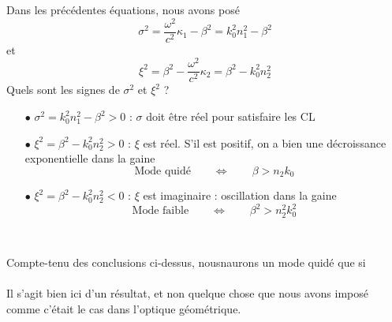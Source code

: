 Dans les précédentes équations, nous avons posé
\begin{equation}
{\sigma ^2} = \frac{{{\omega ^2}}}{{{c^2}}}{\kappa _1} - {\beta ^2} = k_0^2n_1^2 - {\beta ^2}
\end{equation}
et
\begin{equation}
{\xi ^2} = {\beta ^2} - \frac{{{\omega ^2}}}{{{c^2}}}{\kappa _2} = {\beta ^2} - k_0^2n_2^2
\end{equation}
Quels sont les signes de $\sigma^2$ et $\xi^2$ ? 
\begin{itemize}
\item[$\bullet$] ${\sigma ^2} = k_0^2n_1^2 - {\beta ^2} > 0$ : $\sigma$ doit être réel pour 
satisfaire les CL
\item[$\bullet$] ${\xi ^2} = {\beta ^2} - k_0^2n_2^2 > 0$ : $\xi$ est réel. S'il est positif, on a
bien une décroissance exponentielle dans la gaine
\begin{equation}
\text{Mode quidé}\qquad\Leftrightarrow\qquad \beta > n_2k_0
\end{equation}
\item[$\bullet$] ${\xi ^2} = {\beta ^2} - k_0^2n_2^2 < 0$ : $\xi$ est imaginaire : oscillation 
dans la gaine
\begin{equation}
\text{Mode faible}\qquad\Leftrightarrow\qquad \beta^2> n_2^2k_0^2
\end{equation}
\end{itemize}\

Compte-tenu des conclusions ci-dessus, nousnaurons un mode quidé que si\\

\ \\

Il s'agit bien ici d'un résultat, et non quelque chose que nous avons imposé comme c'était le cas
dans l'optique géométrique.


